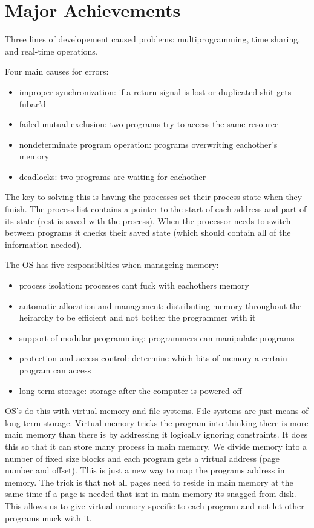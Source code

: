 \documentclass[12pt]{article}
\begin{document}
\section{Major Achievements}
Three lines of developement caused problems: multiprogramming, time sharing, and real-time operations.

Four main causes for errors:
\begin{itemize}
    \item improper synchronization: if a return signal is lost or duplicated shit gets fubar'd
    \item failed mutual exclusion: two programs try to access the same resource
    \item nondeterminate program operation: programs overwriting eachother's memory
    \item deadlocks: two programs are waiting for eachother
\end{itemize}

The key to solving this is having the processes set their process state when they finish. The process list contains a pointer to the start of each address and part of its state (rest is saved with the process). When the processor needs to switch between programs it checks their saved state (which should contain all of the information needed).

The OS has five responsibilties when manageing memory:
\begin{itemize}
     \item process isolation: processes cant fuck with eachothers memory
     \item automatic allocation and management: distributing memory throughout the heirarchy to be efficient and not bother the programmer with it
     \item support of modular programming: programmers can manipulate programs
     \item protection and access control: determine which bits of memory a certain program can access
     \item long-term storage: storage after the computer is powered off
 \end{itemize}

OS's do this with virtual memory and file systems. File systems are just means of long term storage. Virtual memory tricks the program into thinking there is more main memory than there is by addressing it logically ignoring constraints. It does this so that it can store many process in main memory. We divide memory into a number of fixed size blocks and each program gets a virtual address (page number and offset). This is just a new way to map the programs address in memory. The trick is that not all pages need to reside in main memory at the same time if a page is needed that isnt in main memory its snagged from disk. This allows us to give virtual memory specific to each program and not let other programs muck with it.
\end{document}
